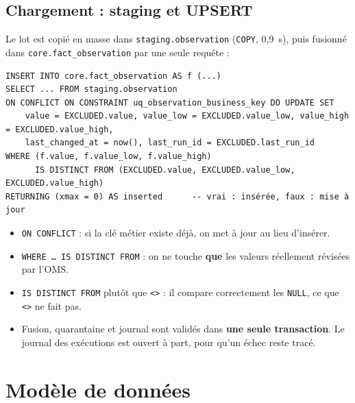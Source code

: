 \documentclass[11pt, a4paper, oneside, headings=normal, numbers=noenddot, DIV=12]{scrartcl}
\begin{document}
\subsection{Chargement : staging et UPSERT}
Le lot est copié en masse dans \texttt{staging.}\allowbreak\texttt{observation} (\texttt{COPY}, 0,9~s), puis fusionné dans \texttt{core.}\allowbreak\texttt{fact\_observation} par
une seule requête :

\begin{lstlisting}[language=DuckSQL]
INSERT INTO core.fact_observation AS f (...)
SELECT ... FROM staging.observation
ON CONFLICT ON CONSTRAINT uq_observation_business_key DO UPDATE SET
    value = EXCLUDED.value, value_low = EXCLUDED.value_low, value_high = EXCLUDED.value_high,
    last_changed_at = now(), last_run_id = EXCLUDED.last_run_id
WHERE (f.value, f.value_low, f.value_high)
      IS DISTINCT FROM (EXCLUDED.value, EXCLUDED.value_low, EXCLUDED.value_high)
RETURNING (xmax = 0) AS inserted      -- vrai : insérée, faux : mise à jour
\end{lstlisting}

\begin{itemize}[leftmargin=1.2em]
  \item \texttt{ON CONFLICT} : si la clé métier existe déjà, on met à jour au lieu d'insérer.
  \item \texttt{WHERE … IS DISTINCT FROM} : on ne touche \textbf{que} les valeurs réellement révisées par l'OMS.
  \item \texttt{IS DISTINCT FROM} plutôt que \texttt{<>} : il compare correctement les \texttt{NULL}, ce que \texttt{<>} ne fait pas.
  \item Fusion, quarantaine et journal sont validés dans \textbf{une seule transaction}. Le journal des exécutions est ouvert à part,
        pour qu'un échec reste tracé.
\end{itemize}

\section{Modèle de données}
\end{document}
